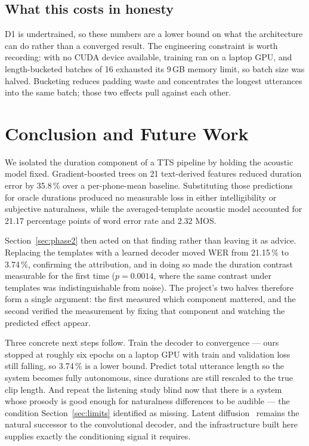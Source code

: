 \documentclass[conference]{IEEEtran}
\begin{document}
\subsection{What this costs in honesty}
D1 is undertrained, so these numbers are a lower bound on what the architecture can do rather than
a converged result. The engineering constraint is worth recording: with no CUDA device available,
training ran on a laptop GPU, and length-bucketed batches of 16 exhausted its 9\,GB memory limit,
so batch size was halved. Bucketing reduces padding waste and concentrates the longest utterances
into the same batch; those two effects pull against each other.

\section{Conclusion and Future Work}
\label{sec:future}

We isolated the duration component of a TTS pipeline by holding the acoustic model fixed.
Gradient-boosted trees on 21 text-derived features reduced duration error by 35.8\,\% over a
per-phone-mean baseline. Substituting those predictions for oracle durations produced no
measurable loss in either intelligibility or subjective naturalness, while the averaged-template
acoustic model accounted for 21.17 percentage points of word error rate and 2.32 MOS.

Section~\ref{sec:phase2} then acted on that finding rather than leaving it as advice. Replacing
the templates with a learned decoder moved WER from 21.15\,\% to 3.74\,\%, confirming the
attribution, and in doing so made the duration contrast measurable for the first time
($p = 0.0014$, where the same contrast under templates was indistinguishable from noise). The
project's two halves therefore form a single argument: the first measured which component
mattered, and the second verified the measurement by fixing that component and watching the
predicted effect appear.

Three concrete next steps follow. Train the decoder to convergence --- ours stopped at roughly six
epochs on a laptop GPU with train and validation loss still falling, so 3.74\,\% is a lower
bound. Predict total utterance length so the system becomes fully autonomous, since durations are
still rescaled to the true clip length. And repeat the listening study blind now that there is a
system whose prosody is good enough for naturalness differences to be audible --- the condition
Section~\ref{sec:limits} identified as missing. Latent diffusion~\cite{liu2023audioldm} remains
the natural successor to the convolutional decoder, and the infrastructure built here supplies
exactly the conditioning signal it requires.
\end{document}
